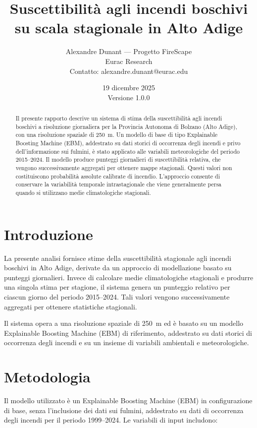 \documentclass[11pt,a4paper]{article}
\title{\textbf{Suscettibilità agli incendi boschivi su scala stagionale in Alto Adige}\\
\large }
\author{
    Alexandre Dunant --- Progetto FireScape\\
    Eurac Research\\
    Contatto: alexandre.dunant@eurac.edu
}
\date{19 dicembre 2025\\Versione 1.0.0}
\begin{document}
\maketitle

\begin{abstract}
Il presente rapporto descrive un sistema di stima della suscettibilità agli incendi boschivi a risoluzione giornaliera per la Provincia Autonoma di Bolzano (Alto Adige), con una risoluzione spaziale di 250~m. Un modello di base di tipo Explainable Boosting Machine (EBM), addestrato su dati storici di occorrenza degli incendi e privo dell’informazione sui fulmini, è stato applicato alle variabili meteorologiche del periodo 2015--2024. Il modello produce punteggi giornalieri di suscettibilità relativa, che vengono successivamente aggregati per ottenere mappe stagionali. Questi valori non costituiscono probabilità assolute calibrate di incendio. L’approccio consente di conservare la variabilità temporale intrastagionale che viene generalmente persa quando si utilizzano medie climatologiche stagionali.
\end{abstract}

\section{Introduzione}

La presente analisi fornisce stime della suscettibilità stagionale agli incendi boschivi in Alto Adige, derivate da un approccio di modellazione basato su punteggi giornalieri. Invece di calcolare medie climatologiche stagionali e produrre una singola stima per stagione, il sistema genera un punteggio relativo per ciascun giorno del periodo 2015--2024. Tali valori vengono successivamente aggregati per ottenere statistiche stagionali.

Il sistema opera a una risoluzione spaziale di 250~m ed è basato su un modello Explainable Boosting Machine (EBM) di riferimento, addestrato su dati storici di occorrenza degli incendi e su un insieme di variabili ambientali e meteorologiche.

\section{Metodologia}

Il modello utilizzato è un Explainable Boosting Machine (EBM) in configurazione di base, senza l’inclusione dei dati sui fulmini, addestrato su dati di occorrenza degli incendi per il periodo 1999--2024. Le variabili di input includono:
\end{document}
